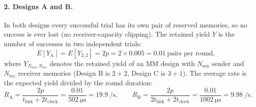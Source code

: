 \paragraph{2. Designs A and B.}
In both designs every successful trial has its own pair of reserved memories, so no success is ever lost
(no receiver-capacity clipping). The retained yield $Y$ is the number of successes in two independent trials:
\begin{equation}
  E[Y_\mathrm{A}] = E[Y_{2,2}] = 2p = 2\times0.005 = 0.01 \ \text{pairs per round},
\end{equation}
where $Y_{N_\mathrm{sen},N_\mathrm{rec}}$ denotes the retained yield of an MM design with $N_\mathrm{sen}$ sender
and $N_\mathrm{rec}$ receiver memories (Design B is $2+2$, Design C is $3+1$).
The average rate is the expected yield divided by the round duration:
\begin{equation}
  R_\mathrm{A} = \frac{2p}{t_\mathrm{link}+2t_\mathrm{clock}} = \frac{0.01}{\SI{502}{\micro\second}} = \SI{19.9}{\per\second},
  \qquad
  R_\mathrm{B} = \frac{2p}{2t_\mathrm{link}+2t_\mathrm{clock}} = \frac{0.01}{\SI{1002}{\micro\second}} = \SI{9.98}{\per\second}.
\end{equation}

